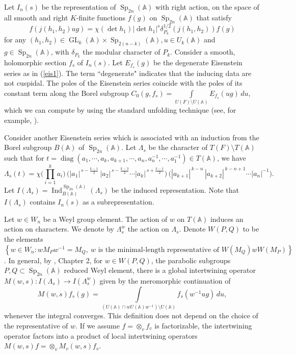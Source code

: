 \documentclass[11pt,notitlepage]{amsart}
\theoremstyle{definition}
\theoremstyle{remark}
\newcommand{\bbA}{\mathbb{A}}
\DeclareMathOperator{\GL}{GL}
\DeclareMathOperator{\Sp}{Sp}
\DeclareMathOperator{\diag}{diag}
\DeclareMathOperator{\Ind}{Ind}
\begin{document}
Let $I_n(s)$ be the representation of $\Sp_{2n}(\bbA)$ with right action, on the space of all smooth and right $K$-finite functions $f(g)$ on $\Sp_{2n}(\bbA)$ that satisfy
\begin{equation}\label{eq301}
  f(j(h_1,h_2)ug) = \chi(\det h_1)|\det h_1|^s \delta_{P_k}^{1/2}(j(h_1,h_2))f(g)
\end{equation}
for any $(h_1,h_2)\in \GL_k(\bbA)\times \Sp_{2(n-k)}(\bbA), u\in U_k(\bbA)$ and $g\in \Sp_{2n}(\bbA)$, with $\delta_{P_k}$ the modular character of $P_k$. Consider a smooth, holomorphic section $f_s$ of $I_n(s)$. Let $E_{f_s}(g)$ be the degenerate Eisenstein series as in (\ref{eis1}). The term ``degenerate" indicates that the inducing data are not cuspidal. The poles of the Eisenstein series coincide with the poles of its constant term along the Borel subgroup
  $C_0(g,f_s) = \int\limits_{U(F)\setminus U(\bbA)}E_{f_s}(ug)\,du$, which we can compute by using the standard unfolding technique (see, for example, \cite{Muic08}). 

Consider another Eisenstein series which is associated with an induction from the Borel subgroup $B(\bbA)$ of $\Sp_{2n}(\bbA)$. Let $\Lambda_s$ be the character of $T(F)\setminus T(\bbA)$ such that for $t=\diag(a_1,\cdots,a_k,a_{k+1},\cdots,a_n,a_n^{-1},\cdots,a_1^{-1})\in  T(\bbA)$, we have 
\begin{equation}
\Lambda_s(t)
= \chi\!\Big(\prod_{i=1}^k a_i\Big)\,
\Big(|a_1|^{\,s-\frac{k-1}{2}}\,
|a_2|^{\,s-\frac{k-3}{2}}\cdots
|a_k|^{\,s+\frac{k-1}{2}}\Big)\,
\Big(|a_{k+1}|^{\,k-n}\,
|a_{k+2}|^{\,k-n+1}\cdots
|a_n|^{-1}\Big).
\end{equation}
Let $I(\Lambda_s) = \Ind_{B(\bbA)}^{\Sp_{2n}(\bbA)}\left(\Lambda_s\right)$ be the induced representation. Note that $I(\Lambda_s)$ contains $I_n(s)$ as a subrepresentation. 

Let $w\in W_n$ be a Weyl group element. The action of $w$ on $T(\bbA)$ induces an action on characters. We denote by $\Lambda_s^w$ the action on $\Lambda_s$. Denote $W(P,Q)$ to be the elements $
\left\{
w\in W_n:
wM_Pw^{-1}=M_Q,\ 
w \text{ is the minimal-length representative of }
W(M_Q)wW(M_P)
\right\}$. In general, by \cite{BL24}, Chapter 2, for $w\in W(P,Q)$, the parabolic subgroups $P,Q\subset\Sp_{2n}(\bbA)$ reduced Weyl element, there is a global intertwining operator $M(w,s): I(\Lambda_s) \rightarrow I(\Lambda_s^w)$ given by the meromorphic continuation of
\begin{equation}
  M(w,s) f_s(g) = \int\limits_{(U(\bbA)\cap wU(\bbA)w^{-1})\setminus U(\bbA) }f_s(w^{-1}ug)\, du, 
\end{equation}
whenever the integral converges. This definition does not depend on the choice of the representative of $w$. If we assume $f = \otimes_vf_v$ is factorizable, the intertwining operator factors into a product of local intertwining operators 
  $M(w,s) f = \otimes_vM_v(w,s)f_v$. 
  
\end{document}
